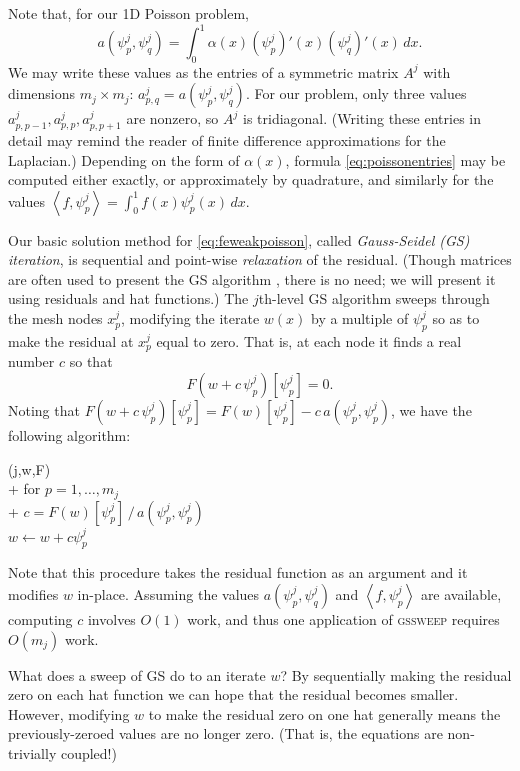 \documentclass[letterpaper,final,12pt,reqno]{amsart}
\theoremstyle{claim}
\newcommand{\ip}[2]{\left<#1,#2\right>}
\numberwithin{equation}{section}
\numberwithin{figure}{section}
\numberwithin{table}{section}
\begin{document}
Note that, for our 1D Poisson problem,
\begin{equation}
  a(\psi_p^j,\psi_q^j) = \int_0^1 \alpha(x) (\psi_p^j)'(x) (\psi_q^j)'(x)\,dx. \label{eq:poissonentries}
\end{equation}
We may write these values as the entries of a symmetric matrix $A^j$ with dimensions $m_j\times m_j$: $a_{p,q}^j = a(\psi_p^j,\psi_q^j)$.  For our problem, only three values $a_{p,p-1}^j, a_{p,p}^j, a_{p,p+1}^j$ are nonzero, so $A^j$ is tridiagonal.  (Writing these entries in detail may remind the reader of finite difference approximations for the Laplacian.)  Depending on the form of $\alpha(x)$, formula \eqref{eq:poissonentries} may be computed either exactly, or approximately by quadrature, and similarly for the values $\ip{f}{\psi_p^j} = \int_0^1 f(x) \psi_p^j(x)\,dx$.

Our basic solution method for \eqref{eq:feweakpoisson}, called \emph{Gauss-Seidel (GS) iteration}, is sequential and point-wise \emph{relaxation} of the residual.  (Though matrices are often used to present the GS algorithm \cite[for example]{Bueler2021,Greenbaum1997}, there is no need; we will present it using residuals and hat functions.)  The $j$th-level GS algorithm sweeps through the mesh nodes $x_p^j$, modifying the iterate $w(x)$ by a multiple of $\psi_p^j$ so as to make the residual at $x_p^j$ equal to zero.  That is, at each node it finds a real number $c$ so that
\begin{equation}
  F(w+c\,\psi_p^j)[\psi_p^j] = 0.  \label{eq:gaussseidelpoint}
\end{equation}
Noting that $F(w+c\,\psi_p^j)[\psi_p^j] = F(w)[\psi_p^j] - c\, a(\psi_p^j,\psi_p^j)$, we have the following algorithm:
\begin{pseudo*}
(j,w,F)\text{:} \\+
    for $p=1,\dots,m_j$ \\+
        $\displaystyle c = F(w)[\psi_p^j]\, \big/ \,a(\psi_p^j,\psi_p^j)$  \\
        $w \gets w + c \psi_p^j$
\end{pseudo*}
Note that this procedure takes the residual function as an argument and it modifies $w$ in-place.  Assuming the values $a(\psi_p^j,\psi_q^j)$ and $\ip{f}{\psi_p^j}$ are available, computing $c$ involves $O(1)$ work, and thus one application of \textsc{gssweep} requires $O(m_j)$ work.

What does a sweep of GS do to an iterate $w$?  By sequentially making the residual zero on each hat function we can hope that the residual becomes smaller.  However, modifying $w$ to make the residual zero on one hat generally means the previously-zeroed values are no longer zero.  (That is, the equations are non-trivially coupled!)
\end{document}
